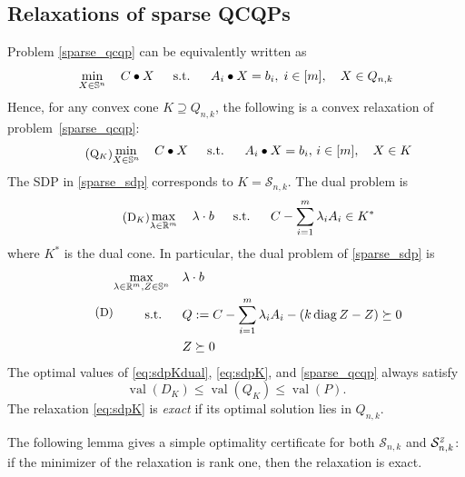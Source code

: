 \documentclass[11pt]{amsart}
\newcommand{\Szero}[2]{\ensuremath{\mathcal{S}_{#1,#2}}}
\newcommand{\Sz}[2]{\ensuremath{\mathcal{S}_{#1,#2}^{\textit{\tiny{Z}}}}}
\theoremstyle{plain}
\theoremstyle{definition}
\theoremstyle{remark}
\newcommand{\RR}{\mathbb{R}}
\renewcommand{\SS}{{\mathbb{S}}}
\newcommand{\st}{\text{\, s.t.\, }}
\DeclareMathOperator{\val}{val}
\DeclareMathOperator{\diag}{diag}
\begin{document}
	
	\subsection{Relaxations of sparse QCQPs}
	
	Problem \eqref{sparse_qcqp} can be equivalently written as
	\begin{equation}%
		\min_{X\in\SS^n} \quad C \bullet X
		\quad \st\quad
		A_i \bullet X  = b_i,\; i \in [m], \quad X \in Q_{n,k} 
	\end{equation}
	Hence, for any convex cone $K \supseteq Q_{n,k}$, the following is a convex relaxation of problem~\eqref{sparse_qcqp}:
	\begin{equation}\label{eq:sdpK}\tag{\small{Q${}_K$}}
		\begin{aligned}
			\min_{X \in \mathbb{S}^n}\quad C \bullet X
			\quad\st\quad
			A_i \bullet X = b_i,\,  i \in [m],\quad
			X\in K
		\end{aligned}
	\end{equation}
	The SDP in \eqref{sparse_sdp} corresponds to $K = \Szero{n}{k}$.
	The dual problem is
	\begin{equation}\label{eq:sdpKdual}\tag{\small{D${}_K$}}
		\begin{aligned}
			\max_{\lambda\in \RR^m}\quad \lambda \cdot b
			\quad\st\quad
			C -  \sum_{i=1}^m \lambda_i A_i  \in K^*
		\end{aligned}
	\end{equation}
	where $K^*$ is the dual cone.
	In particular, the dual problem of \eqref{sparse_sdp} is
	\begin{equation}\label{sparse_sdp_dual}\tag{\small{D}}
		\begin{aligned}
			\max_{\lambda\in \RR^m, Z\in \SS^n}\quad & \lambda \cdot b  \\
			\st\quad &  Q:=C -  \sum_{i=1}^m \lambda_i A_i - (k \diag Z - Z) \succeq 0\\
			& Z \succeq 0
		\end{aligned}
	\end{equation}
	The optimal values of
	\eqref{eq:sdpKdual},
	\eqref{eq:sdpK},
	and
	\eqref{sparse_qcqp} always satisfy
	\[
	\val(D_K) \leq \val(Q_K) \leq \val(P).
	\]
	The relaxation \eqref{eq:sdpK} is \emph{exact} if its optimal solution lies in $Q_{n,k}$.
	
	The following lemma gives a simple optimality certificate for both $\Szero{n}{k}$ and $\Sz{n}{k}$:
	if the minimizer of the relaxation is rank one, then the relaxation is exact.
	
\end{document}
